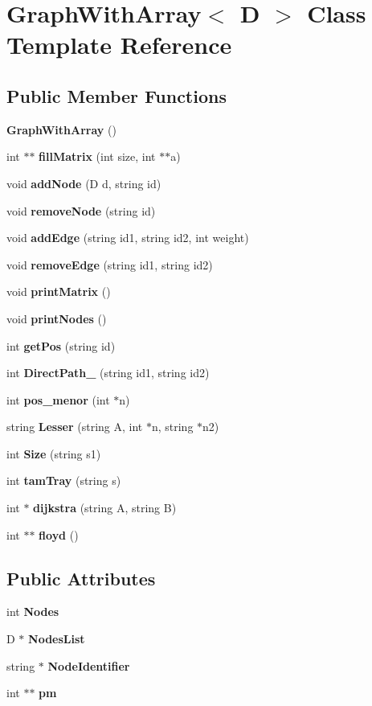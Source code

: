 \section{Graph\-With\-Array$<$ D $>$ Class Template Reference}
\label{class_graph_with_array}
\subsection*{Public Member Functions}
\begin{DoxyCompactItemize}
\item 
{\bf Graph\-With\-Array} ()
\item 
int $\ast$$\ast$ {\bf fill\-Matrix} (int size, int $\ast$$\ast$a)
\item 
void {\bf add\-Node} (D d, string id)
\item 
void {\bf remove\-Node} (string id)
\item 
void {\bf add\-Edge} (string id1, string id2, int weight)
\item 
void {\bf remove\-Edge} (string id1, string id2)
\item 
void {\bf print\-Matrix} ()
\item 
void {\bf print\-Nodes} ()
\item 
int {\bf get\-Pos} (string id)
\item 
int {\bf Direct\-Path\-\_} (string id1, string id2)
\item 
int {\bf pos\-\_\-menor} (int $\ast$n)
\item 
string {\bf Lesser} (string A, int $\ast$n, string $\ast$n2)
\item 
int {\bf Size} (string s1)
\item 
int {\bf tam\-Tray} (string s)
\item 
int $\ast$ {\bf dijkstra} (string A, string B)
\item 
int $\ast$$\ast$ {\bf floyd} ()
\end{DoxyCompactItemize}
\subsection*{Public Attributes}
\begin{DoxyCompactItemize}
\item 
int {\bfseries Nodes}\label{class_graph_with_array_aa49fb4fb43109de534a0149f9e17c54a}

\item 
D $\ast$ {\bfseries Nodes\-List}\label{class_graph_with_array_af19faa579d1f36fedcdc494868267928}

\item 
string $\ast$ {\bfseries Node\-Identifier}\label{class_graph_with_array_a8040b0d019b32bcf0e2482feca6a0e61}

\item 
int $\ast$$\ast$ {\bfseries pm}\label{class_graph_with_array_a0c6134c60c4fd7a7e92b8f9360a04671}

\end{DoxyCompactItemize}


